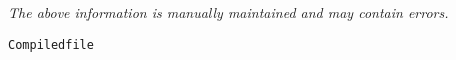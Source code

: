 \label{pkg:compiledfile}

{\tiny \it The above information is manually maintained and may contain errors.}
\begin{verbatim}
Compiledfile
\end{verbatim}
